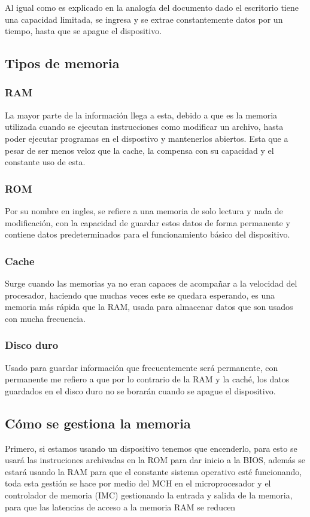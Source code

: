 \documentclass{article}
\begin{document}
Al igual como es explicado en la analogía del documento dado el escritorio tiene una capacidad limitada, se ingresa y se extrae constantemente datos por un tiempo, hasta que se apague el dispositivo.\cite{agusto}

\subsection{Tipos de memoria}

\subsubsection{RAM}
La mayor parte de la información llega a esta, debido a que es la memoria utilizada cuando se ejecutan instrucciones como modificar un archivo, hasta poder ejecutar programas en el dispostivo y mantenerlos abiertos. Esta que a pesar de ser menos veloz que la cache, la compensa con su capacidad y el constante uso de esta.\cite{guille}

\subsubsection{ROM}
Por su nombre en ingles, se refiere a una memoria de solo lectura y nada de modificación, con la capacidad de guardar estos datos de forma permanente y contiene datos predeterminados para el funcionamiento básico del dispositivo.

\subsubsection{Cache}
Surge cuando las memorias ya no eran capaces de acompañar a la velocidad del procesador, haciendo que muchas veces este se quedara esperando, es una memoria más rápida que la RAM, usada para almacenar datos que son usados con mucha frecuencia.

\subsubsection{Disco duro}
Usado para guardar información que frecuentemente será permanente, con permanente me refiero a que por lo contrario de la RAM  y la caché, los datos guardados en el disco duro no se borarán cuando se apague el dispositivo.
\vspace{5 cm}
\subsection{Cómo se gestiona la memoria}
Primero, si estamos usando un dispositivo tenemos que encenderlo, para esto se usará las instruciones archivadas en la ROM para dar inicio a la BIOS, además se estará usando la RAM para que el constante sistema operativo esté funcionando, toda esta gestión se hace por medio del MCH en el microprocesador y el controlador de memoria (IMC) gestionando la entrada y salida de la memoria, para que las latencias de acceso a la memoria RAM se reducen
\end{document}
